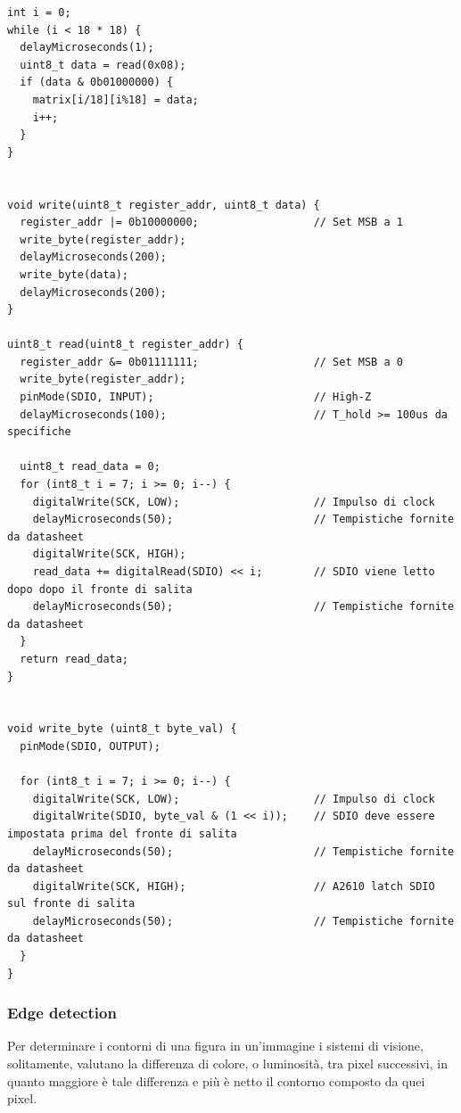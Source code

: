 \documentclass[12pt]{article}
\newenvironment{changemargin}[2]{%
    \begin{list}{}{%
    \setlength{\topsep}{0pt}%
    \setlength{\leftmargin}{#1}%
    \setlength{\rightmargin}{#2}%
    \setlength{\listparindent}{\parindent}%
    \setlength{\itemindent}{\parindent}%
    \setlength{\parsep}{\parskip}%
    }%
    \item[]}{\end{list}}
\begin{document}
        \begin{changemargin}{-2cm}{-2cm}
        \begin{lstlisting}[label={list:protocol_implementation}, style=Arduino, caption=Lettura immagine da sensore, basicstyle=\scriptsize]
int i = 0;
while (i < 18 * 18) {
  delayMicroseconds(1);
  uint8_t data = read(0x08);
  if (data & 0b01000000) {
    matrix[i/18][i%18] = data;
    i++;
  }
}


void write(uint8_t register_addr, uint8_t data) {
  register_addr |= 0b10000000;                  // Set MSB a 1
  write_byte(register_addr);
  delayMicroseconds(200);
  write_byte(data);
  delayMicroseconds(200);
}

uint8_t read(uint8_t register_addr) {
  register_addr &= 0b01111111;                  // Set MSB a 0
  write_byte(register_addr);
  pinMode(SDIO, INPUT);                         // High-Z
  delayMicroseconds(100);                       // T_hold >= 100us da specifiche

  uint8_t read_data = 0;
  for (int8_t i = 7; i >= 0; i--) {
    digitalWrite(SCK, LOW);                     // Impulso di clock
    delayMicroseconds(50);                      // Tempistiche fornite da datasheet
    digitalWrite(SCK, HIGH);
    read_data += digitalRead(SDIO) << i;        // SDIO viene letto dopo dopo il fronte di salita
    delayMicroseconds(50);                      // Tempistiche fornite da datasheet
  }
  return read_data;
}


void write_byte (uint8_t byte_val) {
  pinMode(SDIO, OUTPUT);

  for (int8_t i = 7; i >= 0; i--) {
    digitalWrite(SCK, LOW);                     // Impulso di clock
    digitalWrite(SDIO, byte_val & (1 << i));    // SDIO deve essere impostata prima del fronte di salita
    delayMicroseconds(50);                      // Tempistiche fornite da datasheet
    digitalWrite(SCK, HIGH);                    // A2610 latch SDIO sul fronte di salita
    delayMicroseconds(50);                      // Tempistiche fornite da datasheet
  }
}       \end{lstlisting}
        \end{changemargin}
        
        \newpage
        \subsubsection{Edge detection}\label{edge_detection}
        Per determinare i contorni di una figura in un'immagine i sistemi di visione, solitamente, valutano la differenza di colore, o luminosità, tra pixel successivi, in quanto maggiore è tale differenza e più è netto il contorno composto da quei pixel.
        
\end{document}
